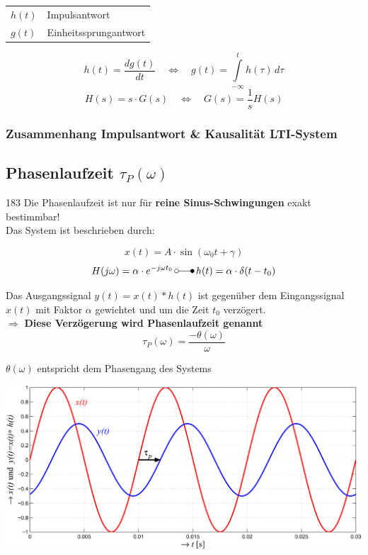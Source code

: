 \begin{tabular}{ll}
    $h(t)$ & Impulsantwort \\
    $g(t)$ & Einheitssprungantwort
\end{tabular}

$$ \boxed{ h(t) =  \frac{dg(t)}{dt}  \quad \Leftrightarrow \quad g(t) = \int\limits_{-\infty}^t  h(\tau) \, d \tau }  $$
$$ \boxed{ H(s) = s \cdot G(s) \quad \Leftrightarrow \quad G(s) =  \frac{1}{s} H(s) }  $$


\subsubsection{Zusammenhang Impulsantwort \& Kausalität LTI-System}


\subsection{Phasenlaufzeit $\tau_P(\omega)$}{183}
Die Phasenlaufzeit ist nur für \textbf{reine Sinus-Schwingungen} exakt bestimmbar! \\
Das System ist beschrieben durch:

$$ x(t) = A \cdot \sin(\omega_0 t + \gamma) $$
$$ H( j \omega) = \alpha \cdot e^{- j \omega t_0} \, \laplace \, h(t) = \alpha \cdot \delta(t - t_0) $$


Das Ausgangssignal $y(t) = x(t) * h(t)$ ist gegenüber dem Eingangssignal $x(t)$ mit Faktor $\alpha$ gewichtet und 
um die Zeit $t_0$ verzögert. \\
$\Rightarrow$ \textbf{Diese Verzögerung wird Phasenlaufzeit genannt}
$$ \boxed{ \tau_P(\omega) = \frac{- \theta(\omega)}{\omega} } $$

$ \theta(\omega)$ entspricht dem Phasengang des Systems 


\includegraphics[width=0.8\linewidth]{images/phasenlaufzeit.png}


